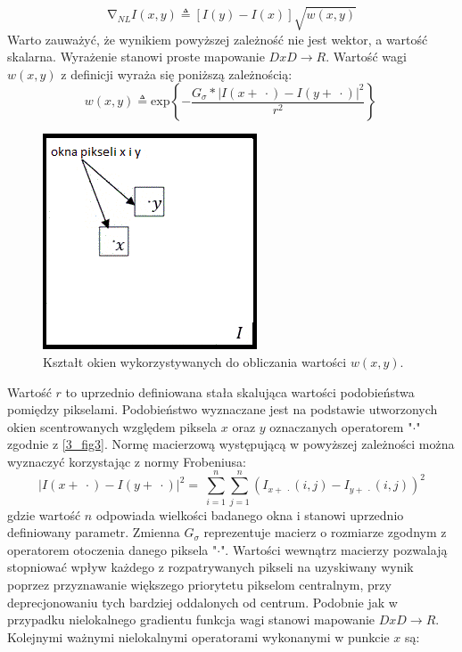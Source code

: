 \documentclass[12pt, twoside, openany]{report}
\theoremstyle{definition}
\begin{document}
\begin{equation}
{\mathrm{\nabla }}_{NL}I\left(x,y\right)\triangleq \left[I\left(y\right)-I\left(x\right)\right]\sqrt{w(x,y)}
\label{NLGRAD}
\end{equation}
Warto zauważyć, że wynikiem powyższej zależność nie jest wektor, a wartość skalarna. Wyrażenie stanowi proste mapowanie $DxD\longrightarrow R$. Wartość wagi $w(x,y)$ z definicji wyraża się poniższą zależnością:
\begin{equation}
w\left(x,y\right)\triangleq {\mathrm{exp} \left\{-\frac{G_{\sigma }*{\left|I\left(x+\ \cdot \right)-I\left(y+\ \cdot \right)\right|}^2}{r^2}\right\}\ }
\label{NLWEIGHT}
\end{equation}
\begin{figure}[!h]
	\centering
	\includegraphics[scale=1]{rysunki/3_fig3.png}
	\caption{Kształt okien wykorzystywanych do obliczania wartości $w(x,y)$.}
	\label{3_fig3}
\end{figure}
Wartość $r$ to uprzednio definiowana stała skalująca wartości podobieństwa pomiędzy pikselami. Podobieństwo wyznaczane jest na podstawie utworzonych okien scentrowanych względem piksela $x$ oraz $y$ oznaczanych operatorem "$\cdot$" zgodnie z \autoref{3_fig3}. Normę macierzową występującą w powyższej zależności można wyznaczyć korzystając z normy Frobeniusa:
\begin{equation}
{\left|I\left(x+\ \cdot \right)-I\left(y+\ \cdot \right)\right|}^2=\ \sum^n_{i=1}{\sum^n_{j=1}{{\left(I_{x+\ \cdot }\left(i,j\right)-I_{y+\ \cdot }\left(i,j\right)\right)}^2}}
\label{FROBENIUS}
\end{equation}
gdzie wartość $n$ odpowiada wielkości badanego okna i stanowi uprzednio definiowany parametr. Zmienna $G_\sigma$ reprezentuje macierz o rozmiarze zgodnym z operatorem otoczenia danego piksela "$\cdot$". Wartości wewnątrz macierzy pozwalają stopniować wpływ każdego z rozpatrywanych pikseli na uzyskiwany wynik poprzez przyznawanie większego priorytetu pikselom centralnym, przy deprecjonowaniu tych bardziej oddalonych od centrum. Podobnie jak w przypadku nielokalnego gradientu funkcja wagi stanowi mapowanie $DxD\longrightarrow R$. Kolejnymi ważnymi nielokalnymi operatorami wykonanymi w punkcie $x$ są: 
\end{document}
